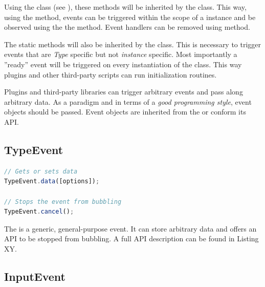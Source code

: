 Using the  class (see ), these methods will be inherited by the  class. This way, using the  method, events can be triggered within the scope of a  instance and be observed using the  the  method. Event handlers can be removed using  method.

The static methods will also be inherited by the  class. This is necessary to trigger events that are \textit{Type} specific but not \textit{instance} specific. Most importantly a ''ready'' event will be triggered on every instantiation of the  class. This way plugins and other third-party scripts can run initialization routines.


Plugins and third-party libraries can trigger arbitrary events and pass along arbitrary data. As a paradigm and in terms of a \textit{good programming style}, event objects should be passed. Event objects are inherited from the  or conform its API.

\subsection{TypeEvent}
\label{subsec:type_event}

\begin{lstlisting}[language=JavaScript, caption={TypeEvent API}, label=lst:eventapi_methods]
// Gets or sets data
TypeEvent.data([options]);

// Stops the event from bubbling
TypeEvent.cancel();
\end{lstlisting}

The  is a generic, general-purpose event. It can store arbitrary data and offers an API to be stopped from bubbling. A full API description can be found in Listing XY.

\subsection{InputEvent}
\label{subsec:input_event}

